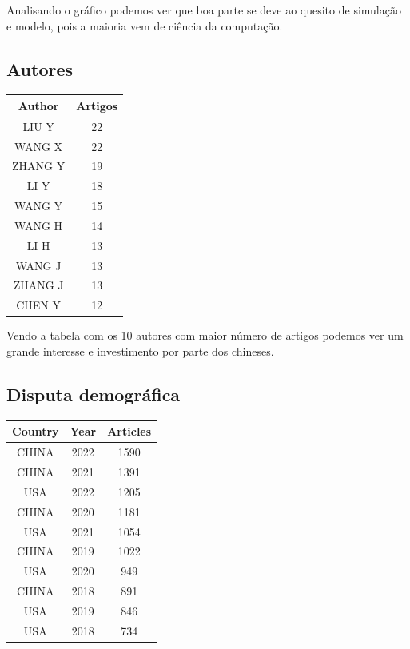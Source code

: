 Analisando o gráfico podemos ver que boa parte se deve ao quesito de simulação e modelo, pois a maioria vem de ciência da computação.

\subsection{Autores}

\begin{center}
\begin{tabular}{||c c ||} 
\hline
 Author & Artigos\\ [0.5ex] 
 \hline\hline
LIU Y	& 22\\ \hline
WANG X	& 22\\ \hline
ZHANG Y	& 19\\ \hline
LI Y	& 18\\ \hline
WANG Y	& 15\\ \hline
WANG H	& 14\\ \hline
LI H	& 13\\ \hline
WANG J	& 13\\ \hline
ZHANG J	& 13\\ \hline
CHEN Y	& 12\\ \hline
\end{tabular}
\end{center}

Vendo a tabela com os 10 autores com maior número de artigos podemos ver um grande interesse e investimento  por parte dos chineses.

\subsection{Disputa demográfica}

\begin{center}
\begin{tabular}{||c c c ||} 
\hline
 Country & Year & Articles\\ [0.5ex] 
 \hline\hline
CHINA	& 2022	& 1590\\ \hline
CHINA	& 2021	& 1391\\ \hline
USA	& 2022	& 1205\\ \hline
CHINA	& 2020	& 1181\\ \hline
USA	& 2021	& 1054\\ \hline
CHINA	& 2019	& 1022\\ \hline
USA	& 2020	& 949\\ \hline
CHINA	& 2018	& 891\\ \hline
USA	& 2019	& 846\\ \hline
USA	& 2018	& 734\\ \hline
\end{tabular}
\end{center}

